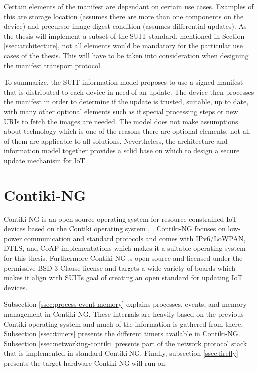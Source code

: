 \documentclass[0-thesis.tex]{subfiles}
\begin{document}

Certain elements of the manifest are dependant on certain use cases. Examples of this are
storage location (assumes there are more than one components on the device) and precursor
image digest condition (assumes differential updates). As the thesis will implement a
subset of the SUIT standard, mentioned in Section \ref{ssec:architecture}, not all
elements would be mandatory for the particular use cases of the thesis. This will have to
be taken into consideration when designing the manifest transport protocol.

To summarize, the SUIT information model proposes to use a signed manifest that is
distributed to each device in need of an update. The device then processes the manifest in
order to determine if the update is trusted, suitable, up to date, with many other
optional elements such as if special processing steps or new URIs to fetch the images are
needed. The model does not make assumptions about technology which is one of the reasons
there are optional elements, not all of them are applicable to all solutions.
Nevertheless, the architecture and information model together provides a solid base on
which to design a secure update mechanism for IoT.

\section{Contiki-NG}
\label{ssec:contiki-ng}
Contiki-NG is an open-source operating system for resource constrained IoT devices based
on the Contiki operating system \parencite{contiki-ng-github}, \parencite{contiki-github}.
Contiki-NG focuses on low-power communication and standard protocols and comes with
IPv6/LoWPAN, DTLS, and CoAP implementations which makes it a suitable operating system for
this thesis. Furthermore Contiki-NG is open source and licensed under the permissive BSD
3-Clause license and targets a wide variety of boards which makes it align with SUITs goal
of creating an open standard for updating IoT devices.

Subsection \ref{ssec:process-event-memory} explains processes, events, and memory
management in Contiki-NG. These internals are heavily based on the previous Contiki
operating system and much of the information is gathered from there. Subsection
\ref{ssec:timers} presents the different timers available in Contiki-NG. Subsection
\ref{ssec:networking-contiki} presents part of the network protocol stack that is
implemented in standard Contiki-NG. Finally, subsection \ref{ssec:firefly} presents the
target hardware Contiki-NG will run on.
\end{document}
